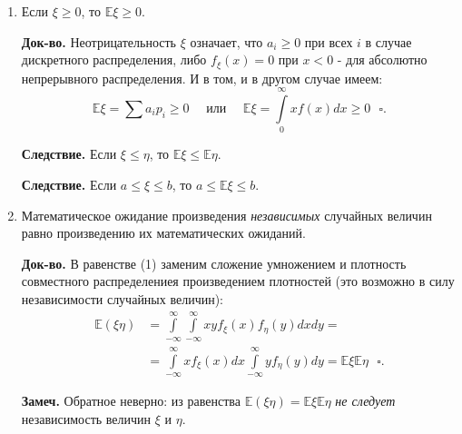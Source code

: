 \documentclass[oneside,final,14pt]{extreport}
\newcommand\mynote{{\bf Замеч.}}
\newcommand\mycon{{\bf Следствие.}}
\newcommand\myqed{{\bf Док-во.}}
\theoremstyle{definition}
\begin{document}
\begin{enumerate}
    \myqed{} Воспользуемся равенством (1) и теоремой о совместном распределении:
    $$\begin{aligned}
    \mathbb{E}(\xi+\eta) &=\int\limits_{-\infty}^{\infty} \int\limits_{-\infty}^{\infty}(x+y) f(x, y) d x d y=\\
    &=\int\limits_{-\infty}^{\infty} x d x \int\limits_{-\infty}^{\infty} f(x, y) d y+\int\limits_{-\infty}^{\infty} y d y \int\limits_{-\infty}^{\infty} f(x, y) d x=\\
    &=\int\limits_{-\infty}^{\infty} x f_{\xi}(x) d x+\int\limits_{-\infty}^{\infty} y f_{\eta}(y) d y=\mathbb{E} \xi+\mathbb{E} \eta ~~~ \square.
    \end{aligned}$$
    \item Если $\xi \geq 0$, то $\mathbb{E}\xi \geq 0.$
    
    \myqed{} Неотрицательность $\xi$ означает, что $a_i \geq 0$ при всех $i$ в случае дискретного распределения, либо $f_\xi(x) = 0$ при $x < 0$ - для абсолютно непрерывного распределения. И в том, и в другом случае имеем:
    $$\mathbb{E} \xi=\sum a_{i} p_{i} \geqslant 0 \quad \text { или } \quad \mathbb{E} \xi=\int\limits_{0}^{\infty} x f(x) d x \geqslant 0 ~~~ \square.$$
    
    \mycon{} Если $\xi \leqslant \eta$, то $\mathbb{E}\xi \leqslant \mathbb{E}\eta.$
    
    \mycon{} Если $a \leqslant \xi \leqslant b$, то $a \leqslant \mathbb{E}\xi \leqslant b$.
    
    \item Математическое ожидание произведения {\it независимых} случайных величин равно произведению их математических ожиданий.
    
    \myqed{} В равенстве (1) заменим сложение умножением и плотность совместного распределениея произведением плотностей (это возможно в силу независимости случайных величин):
    $$\begin{aligned}
    \mathbb{E}(\xi \eta) &=\int\limits_{-\infty}^{\infty} \int\limits_{-\infty}^{\infty} x y f_{\xi}(x) f_{\eta}(y) d x d y=\\
    &=\int\limits_{-\infty}^{\infty} x f_{\xi}(x) d x \int\limits_{-\infty}^{\infty} y f_{\eta}(y) d y=\mathbb{E} \xi \mathbb{E} \eta ~~~ \square.
    \end{aligned}$$
    
    \mynote{} Обратное неверно: из равенства $\mathbb{E}(\xi \eta) = \mathbb{E}\xi \mathbb{E} \eta$ {\it не следует} независимость величин $\xi$ и $\eta$.
\end{enumerate}
\end{document}
